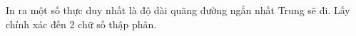 In ra một số thực duy nhất là độ dài quãng đường ngắn nhất Trung sẽ đi. Lấy chính xác đến 2 chữ số thập phân.